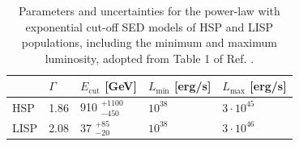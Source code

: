\begin{table}[t!]
\centering
\begin{tabular}{|m{} |m{} m{} m{} m{}|} 
\hline
  & $\varGamma$ & $E_{\text{cut}}$ [GeV] & $L_\textrm{min}$ [erg/s] & $L_\textrm{max}$ [erg/s]  \\ [0.5ex]
 \hline
 HSP & 1.86 & 910 $^{+1100}_{-450}$ & $10^{38}$ & $3\cdot 10^{45}$  \\ [0.5ex]
 LISP & 2.08 & 37 $^{+85}_{-20}$ & $10^{38}$ & $3\cdot 10^{46}$ \\ [1ex]
 \hline 
\end{tabular}
\caption{Parameters and uncertainties for the power-law with exponential cut-off SED models of HSP and LISP populations, including the minimum and maximum luminosity, adopted from Table 1 of Ref. \cite{DiMauro:2013zfa}.}
\label{table:BLLACS}
\end{table}


